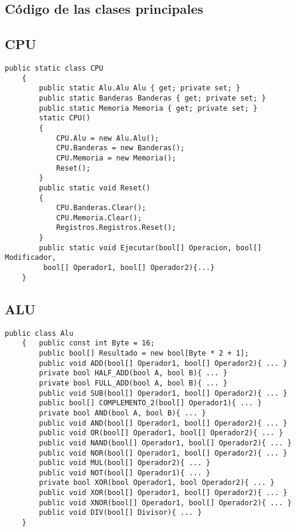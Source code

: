 \documentclass[conference]{IEEEtran}
\begin{document}
\begin{figure*}[t]
    \section{Código de las clases principales}
\subsection{CPU}    
\begin{lstlisting}[language={[Sharp]C}, title={CPU}]
    public static class CPU
    {
        public static Alu.Alu Alu { get; private set; }
        public static Banderas Banderas { get; private set; }
        public static Memoria Memoria { get; private set; }
        static CPU()
        {
            CPU.Alu = new Alu.Alu();
            CPU.Banderas = new Banderas();
            CPU.Memoria = new Memoria();
            Reset();
        }
        public static void Reset()
        {
            CPU.Banderas.Clear();
            CPU.Memoria.Clear();
            Registros.Registros.Reset();
        }
        public static void Ejecutar(bool[] Operacion, bool[] Modificador,
         bool[] Operador1, bool[] Operador2){...}
    }
\end{lstlisting}
\end{figure*}
\newpage

\begin{figure*}[t]
\subsection{ALU}   
\begin{lstlisting}[language={[Sharp]C}, title={ALU}]
    public class Alu
    {   public const int Byte = 16;
        public bool[] Resultado = new bool[Byte * 2 + 1];
        public void ADD(bool[] Operador1, bool[] Operador2){ ... }  
        private bool HALF_ADD(bool A, bool B){ ... }  
        private bool FULL_ADD(bool A, bool B){ ... }  
        public void SUB(bool[] Operador1, bool[] Operador2){ ... }  
        public bool[] COMPLEMENTO_2(bool[] Operador1){ ... }  
        private bool AND(bool A, bool B){ ... }  
        public void AND(bool[] Operador1, bool[] Operador2){ ... }  
        public void OR(bool[] Operador1, bool[] Operador2){ ... }  
        public void NAND(bool[] Operador1, bool[] Operador2){ ... }  
        public void NOR(bool[] Operador1, bool[] Operador2){ ... }  
        public void MUL(bool[] Operador2){ ... }  
        public void NOT(bool[] Operador1){ ... }  
        private bool XOR(bool Operador1, bool Operador2){ ... }  
        public void XOR(bool[] Operador1, bool[] Operador2){ ... }  
        public void XNOR(bool[] Operador1, bool[] Operador2){ ... }  
        public void DIV(bool[] Divisor){ ... }         
    }
\end{lstlisting}
\end{figure*}
\end{document}
